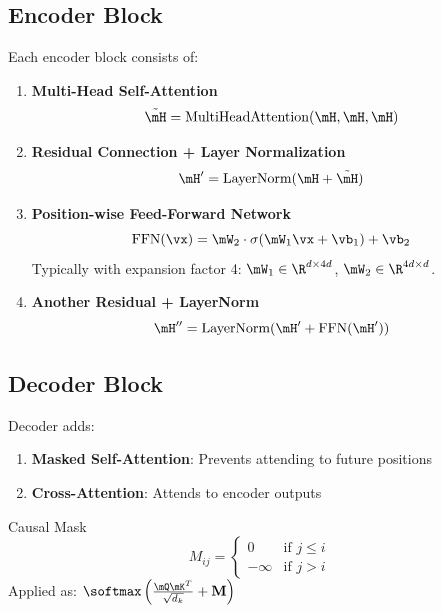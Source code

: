 \subsection{Encoder Block}

Each encoder block consists of:

\begin{enumerate}
    \item \textbf{Multi-Head Self-Attention}
    \begin{equation}
    \tilde{\mH} = \text{MultiHeadAttention}(\mH, \mH, \mH)
    \end{equation}

    \item \textbf{Residual Connection + Layer Normalization}
    \begin{equation}
    \mH' = \text{LayerNorm}(\mH + \tilde{\mH})
    \end{equation}

    \item \textbf{Position-wise Feed-Forward Network}
    \begin{equation}
    \text{FFN}(\vx) = \mW_2 \cdot \sigma(\mW_1 \vx + \vb_1) + \vb_2
    \end{equation}
    Typically with expansion factor 4: $\mW_1 \in \R^{d \times 4d}$, $\mW_2 \in \R^{4d \times d}$.

    \item \textbf{Another Residual + LayerNorm}
    \begin{equation}
    \mH'' = \text{LayerNorm}(\mH' + \text{FFN}(\mH'))
    \end{equation}
\end{enumerate}

\subsection{Decoder Block}

Decoder adds:
\begin{enumerate}
    \item \textbf{Masked Self-Attention}: Prevents attending to future positions
    \item \textbf{Cross-Attention}: Attends to encoder outputs
\end{enumerate}

\begin{mathresult}{Causal Mask}
\begin{equation}
M_{ij} = \begin{cases}
0 & \text{if } j \leq i \\
-\infty & \text{if } j > i
\end{cases}
\end{equation}
Applied as: $\softmax\left(\frac{\mQ\mK^T}{\sqrt{d_k}} + \mathbf{M}\right)$
\end{mathresult}

